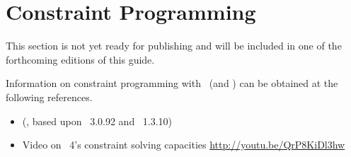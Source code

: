 \section{Constraint Programming}\label{sec:meta}

This section is not yet ready for publishing
and will be included in one of the forthcoming editions of this guide.

Information on constraint programming with \gringo\ (and \clingcon) can be obtained at the following references.

\begin{itemize}
\item \cite{geossc09a,ostsch12a} (\clingcon, based upon \gringo~3.0.92 and \clasp~1.3.10)
\item Video on \gringo~4's constraint solving capacities \url{http://youtu.be/QrP8KiDl3hw}
\end{itemize}

